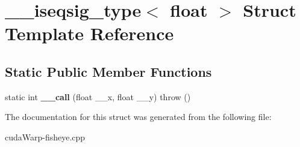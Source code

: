 \hypertarget{struct____iseqsig__type_3_01float_01_4}{}\section{\+\_\+\+\_\+iseqsig\+\_\+type$<$ float $>$ Struct Template Reference}
\label{struct____iseqsig__type_3_01float_01_4}
\subsection*{Static Public Member Functions}
\begin{DoxyCompactItemize}
\item 
static int {\bfseries \+\_\+\+\_\+call} (float \+\_\+\+\_\+x, float \+\_\+\+\_\+y)  throw ()\hypertarget{struct____iseqsig__type_3_01float_01_4_aecdcd0b914fd1d9f3c5283565f0c39a6}{}\label{struct____iseqsig__type_3_01float_01_4_aecdcd0b914fd1d9f3c5283565f0c39a6}

\end{DoxyCompactItemize}


The documentation for this struct was generated from the following file\+:\begin{DoxyCompactItemize}
\item 
cuda\+Warp-\/fisheye.\+cpp\end{DoxyCompactItemize}
